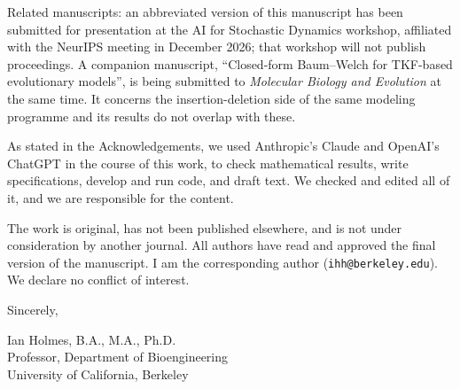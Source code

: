 \documentclass[11pt]{article}
\begin{document}
Related manuscripts: an abbreviated version of this manuscript has been
submitted for presentation at the AI for Stochastic Dynamics workshop, affiliated
with the NeurIPS meeting in December 2026; that workshop will not publish
proceedings. A companion
manuscript, ``Closed-form Baum--Welch for TKF-based evolutionary models'', is
being submitted to \emph{Molecular Biology and Evolution} at the same time. It
concerns the insertion-deletion side of the same modeling programme and its
results do not overlap with these.

As stated in the Acknowledgements, we used Anthropic's Claude and OpenAI's
ChatGPT in the course of this work, to check mathematical results, write
specifications, develop and run code, and draft text. We checked and edited
all of it, and we are responsible for the content.

The work is original, has not been published elsewhere, and is not under
consideration by another journal. All authors have read and approved the final
version of the manuscript. I am the corresponding author
(\texttt{ihh@berkeley.edu}). We declare no conflict of interest.

Sincerely,

\vspace{1em}

Ian Holmes, B.A., M.A., Ph.D.\\
Professor, Department of Bioengineering\\
University of California, Berkeley
\end{document}
